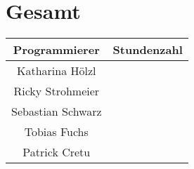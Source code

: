 \section{Gesamt}
\begin{center}
	\begin{tabular}{|c|c|}
		\hline \textbf{Programmierer} & \textbf{Stundenzahl} \\ 
		\hline Katharina Hölzl  &  \\ 
		\hline Ricky Strohmeier &  \\ 
		\hline Sebastian Schwarz &  \\ 
		\hline Tobias Fuchs &  \\ 
		\hline Patrick Cretu &  \\ 
		\hline 
	\end{tabular}
\end{center} 